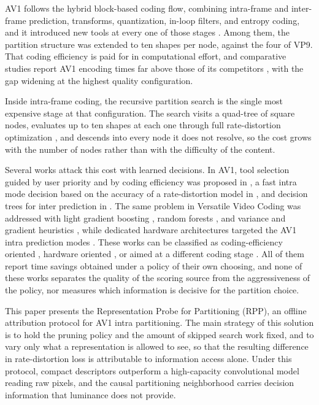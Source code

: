 \documentclass[conference]{IEEEtran}
\begin{document}
AV1 follows the hybrid block-based coding flow, combining intra-frame and
inter-frame prediction, transforms, quantization, in-loop filters, and entropy
coding, and it introduced new tools at every one of those stages
\cite{han2021,chen2018}. Among them, the partition structure was extended to ten
shapes per node, against the four of VP9. That coding efficiency is paid for in
computational effort, and comparative studies report AV1 encoding times far above
those of its competitors \cite{grois2016,layek2017}, with the gap widening at the
highest quality configuration.

Inside intra-frame coding, the recursive partition search is the single most
expensive stage at that configuration. The search visits a quad-tree of square
nodes, evaluates up to ten shapes at each one through full rate-distortion
optimization \cite{sullivan1998}, and descends into every node it does not
resolve, so the cost grows with the number of nodes rather than with the
difficulty of the content.

Several works attack this cost with learned decisions. In AV1, tool selection
guided by user priority and by coding efficiency was proposed in
\cite{xu2020,xu2021}, a fast intra mode decision based on the accuracy of a
rate-distortion model in \cite{jeong2019}, and decision trees for inter prediction
in \cite{kim2019}. The same problem in Versatile Video Coding was addressed with
light gradient boosting \cite{saldanha2022}, random forests \cite{he2021}, and
variance and gradient heuristics \cite{chen2019}, while dedicated hardware
architectures targeted the AV1 intra prediction modes \cite{correa2020,netto2022}.
These works can be classified as coding-efficiency oriented
\cite{jeong2019,xu2021,saldanha2022,he2021,chen2019}, hardware oriented
\cite{correa2020,netto2022}, or aimed at a different coding stage
\cite{xu2020,kim2019}. All of them report time savings obtained under a policy of
their own choosing, and none of these works separates the quality of the scoring
source from the aggressiveness of the policy, nor measures which information is
decisive for the partition choice.

This paper presents the Representation Probe for Partitioning (RPP), an offline
attribution protocol for AV1 intra partitioning. The main strategy of this
solution is to hold the pruning policy and the amount of skipped search work
fixed, and to vary only what a representation is allowed to see, so that the
resulting difference in rate-distortion loss is attributable to information access
alone. Under this protocol, compact descriptors outperform a high-capacity
convolutional model reading raw pixels, and the causal partitioning neighborhood
carries decision information that luminance does not provide.
\end{document}
